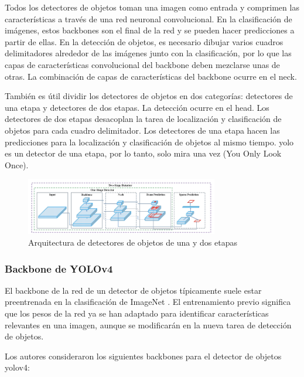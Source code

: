Todos los detectores de objetos toman una imagen como entrada y comprimen las características a través de una red neuronal convolucional. En la clasificación de imágenes, estos backbones son el final de la red y se pueden hacer predicciones a partir de ellas. En la detección de objetos, es necesario dibujar varios cuadros delimitadores alrededor de las imágenes junto con la clasificación, por lo que las capas de características convolucional del backbone deben mezclarse unas de otras. La combinación de capas de características del backbone ocurre en el neck.

También es útil dividir los detectores de objetos en dos categorías: detectores de una etapa y detectores de dos etapas. La detección ocurre en el head. Los detectores de dos etapas desacoplan la tarea de localización y clasificación de objetos para cada cuadro delimitador. Los detectores de una etapa hacen las predicciones para la localización y clasificación de objetos al mismo tiempo. \gls{yolo} es un detector de una etapa, por lo tanto, solo mira una vez (You Only Look Once).

\begin{figure}[ht]
\centering
\includegraphics[width=0.75\textwidth]{img/chapters/estado-del-arte/one-two-stage-detector.png}
\caption{\label{fig:one-two-stage-detector}Arquitectura de detectores de objetos de una y dos etapas \cite{bochkovskiy2020yolov4}}
\end{figure}

\subsubsection*{Backbone de YOLOv4}
\label{subsubsec:yolov4-backbone}

El backbone de la red de un detector de objetos típicamente suele estar preentrenada en la clasificación de ImageNet \cite{russakovsky2015imagenet}. El entrenamiento previo significa que los pesos de la red ya se han adaptado para identificar características relevantes en una imagen, aunque se modificarán en la nueva tarea de detección de objetos.

Los autores consideraron los siguientes backbones para el detector de objetos \gls{yolov4}:

